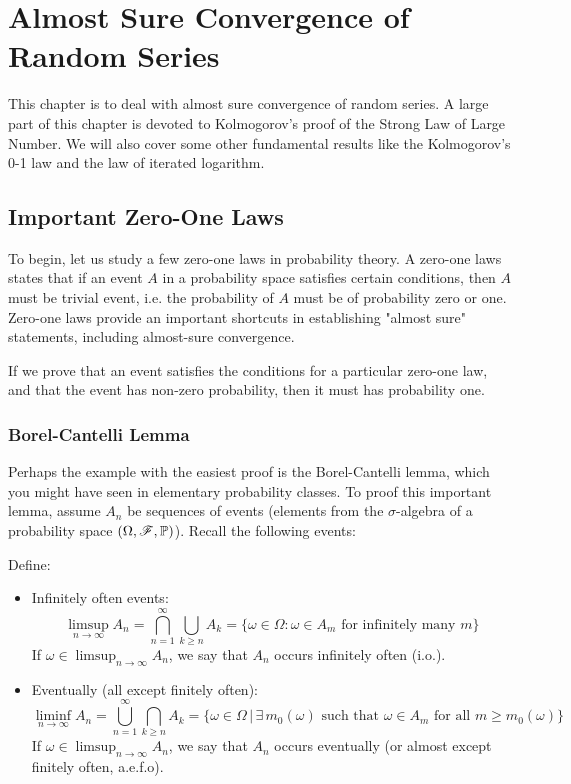 \section{Almost Sure Convergence of Random Series}
This chapter is to deal with almost sure convergence of random series. A large part of this chapter is devoted to Kolmogorov's proof of the Strong Law of Large Number. We will also cover some other fundamental results like the Kolmogorov's 0-1 law and the law of iterated logarithm. 

\subsection{Important Zero-One Laws}
To begin, let us study a few zero-one laws in probability theory. A zero-one laws states that if an event $A$ in a probability space satisfies certain conditions, then $A$ must be trivial event, i.e. the probability of $A$ must be of probability zero or one. Zero-one laws provide an important shortcuts in establishing "almost sure" statements, including almost-sure convergence. 
\begin{example}
If we prove that an event satisfies the conditions for a particular zero-one law, and that the event has non-zero probability, then it must has probability one.
\end{example}

\subsubsection{Borel-Cantelli Lemma}
Perhaps the example with the easiest proof is the Borel-Cantelli lemma, which you might have seen in elementary probability classes. To proof this important lemma, assume $A_n$ be sequences of events (elements from the $\sigma$-algebra of a probability space $(\Omega, \mathcal{F}, \mathbb{P})$). Recall the following events:

\begin{definition} Define:
\begin{itemize}
    \item Infinitely often events:
    \begin{equation}
        \limsup_{n \to \infty} A_n = \bigcap_{n=1}^\infty \bigcup_{k \ge n} A_k = \{ \omega \in \Omega : \omega \in A_m \text{ for infinitely many }m \}
    \end{equation}
    If $\omega \in \limsup_{n \to \infty} A_n$, we say that $A_n$ occurs infinitely often (i.o.).
    \item Eventually (all except finitely often):
    \begin{equation}
        \liminf_{n \to \infty} A_n = \bigcup_{n=1}^\infty \bigcap_{k \ge n} A_k = \{\omega \in \Omega \,|\, \exists \, m_0(\omega) \text{ such that }\omega \in A_m \text{ for all }m \ge m_0(\omega)\}
    \end{equation}
    If $\omega \in \limsup_{n \to \infty} A_n$, we say that $A_n$ occurs eventually (or almost except finitely often, a.e.f.o).
\end{itemize}
\end{definition}

